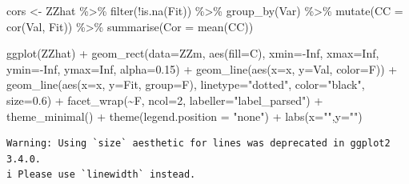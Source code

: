 \documentclass[
  letterpaper,
]{book}
\newenvironment{Shaded}{\begin{snugshade}}{\end{snugshade}}
\newcommand{\AttributeTok}[1]{\textcolor[rgb]{0.40,0.45,0.13}{#1}}
\newcommand{\ConstantTok}[1]{\textcolor[rgb]{0.56,0.35,0.01}{#1}}
\newcommand{\DecValTok}[1]{\textcolor[rgb]{0.68,0.00,0.00}{#1}}
\newcommand{\FloatTok}[1]{\textcolor[rgb]{0.68,0.00,0.00}{#1}}
\newcommand{\FunctionTok}[1]{\textcolor[rgb]{0.28,0.35,0.67}{#1}}
\newcommand{\NormalTok}[1]{\textcolor[rgb]{0.00,0.23,0.31}{#1}}
\newcommand{\OtherTok}[1]{\textcolor[rgb]{0.00,0.23,0.31}{#1}}
\newcommand{\SpecialCharTok}[1]{\textcolor[rgb]{0.37,0.37,0.37}{#1}}
\newcommand{\StringTok}[1]{\textcolor[rgb]{0.13,0.47,0.30}{#1}}
\begin{document}
\begin{Shaded}
\begin{Highlighting}[]
\NormalTok{cors }\OtherTok{\textless{}{-}}\NormalTok{ ZZhat }\SpecialCharTok{\%\textgreater{}\%} 
  \FunctionTok{filter}\NormalTok{(}\SpecialCharTok{!}\FunctionTok{is.na}\NormalTok{(Fit)) }\SpecialCharTok{\%\textgreater{}\%} 
  \FunctionTok{group\_by}\NormalTok{(Var) }\SpecialCharTok{\%\textgreater{}\%} 
  \FunctionTok{mutate}\NormalTok{(}\AttributeTok{CC =} \FunctionTok{cor}\NormalTok{(Val, Fit)) }\SpecialCharTok{\%\textgreater{}\%} 
  \FunctionTok{summarise}\NormalTok{(}\AttributeTok{Cor =} \FunctionTok{mean}\NormalTok{(CC))}

\FunctionTok{ggplot}\NormalTok{(ZZhat) }\SpecialCharTok{+} 
  \FunctionTok{geom\_rect}\NormalTok{(}\AttributeTok{data=}\NormalTok{ZZm, }\FunctionTok{aes}\NormalTok{(}\AttributeTok{fill=}\NormalTok{C), }
            \AttributeTok{xmin=}\SpecialCharTok{{-}}\ConstantTok{Inf}\NormalTok{, }\AttributeTok{xmax=}\ConstantTok{Inf}\NormalTok{, }
            \AttributeTok{ymin=}\SpecialCharTok{{-}}\ConstantTok{Inf}\NormalTok{, }\AttributeTok{ymax=}\ConstantTok{Inf}\NormalTok{, }\AttributeTok{alpha=}\FloatTok{0.15}\NormalTok{) }\SpecialCharTok{+} 
  \FunctionTok{geom\_line}\NormalTok{(}\FunctionTok{aes}\NormalTok{(}\AttributeTok{x=}\NormalTok{x, }\AttributeTok{y=}\NormalTok{Val, }\AttributeTok{color=}\NormalTok{F)) }\SpecialCharTok{+}
  \FunctionTok{geom\_line}\NormalTok{(}\FunctionTok{aes}\NormalTok{(}\AttributeTok{x=}\NormalTok{x, }\AttributeTok{y=}\NormalTok{Fit, }\AttributeTok{group=}\NormalTok{F), }\AttributeTok{linetype=}\StringTok{"dotted"}\NormalTok{, }\AttributeTok{color=}\StringTok{"black"}\NormalTok{, }\AttributeTok{size=}\FloatTok{0.6}\NormalTok{) }\SpecialCharTok{+}
  \FunctionTok{facet\_wrap}\NormalTok{(}\SpecialCharTok{\textasciitilde{}}\NormalTok{F, }\AttributeTok{ncol=}\DecValTok{2}\NormalTok{, }\AttributeTok{labeller=}\StringTok{"label\_parsed"}\NormalTok{) }\SpecialCharTok{+}
  \FunctionTok{theme\_minimal}\NormalTok{() }\SpecialCharTok{+}
  \FunctionTok{theme}\NormalTok{(}\AttributeTok{legend.position =} \StringTok{"none"}\NormalTok{) }\SpecialCharTok{+}
  \FunctionTok{labs}\NormalTok{(}\AttributeTok{x=}\StringTok{""}\NormalTok{,}\AttributeTok{y=}\StringTok{""}\NormalTok{)}
\end{Highlighting}
\end{Shaded}

\begin{verbatim}
Warning: Using `size` aesthetic for lines was deprecated in ggplot2 3.4.0.
i Please use `linewidth` instead.
\end{verbatim}
\end{document}
